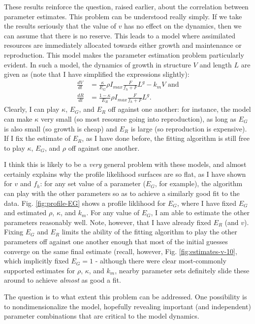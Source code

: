 \documentclass[12pt,reqno,final,pdftex]{amsart}\usepackage[]{graphicx}\usepackage[]{color}
\theoremstyle{plain}
\numberwithin{equation}{part}
\begin{document}
These results reinforce the question, raised earlier, about the correlation between parameter estimates.
This problem can be understood really simply.
If we take the results seriously that the value of $v$ has no effect on the dynamics, then we can assume that there is no reserve.
This leads to a model where assimilated resources are immediately allocated towards either growth and maintenance or reproduction.
This model makes the parameter estimation problem particularly evident.
In such a model, the dynamics of growth in structure $V$ and length $L$ are given as (note that I have simplified the expressions slightly):
\begin{align}
\frac{dV}{dt} &= \frac{\kappa}{E_G} \rho I_{max} \frac{F}{f_h+F} L^g - k_m V \text{ and} \\
\frac{dR}{dt} &= \frac{1-\kappa}{E_R} \rho I_{max} \frac{F}{f_h+F} L^g.
\end{align}
Clearly, I can play $\kappa$, $E_G$, and $E_R$ off against one another: for instance, the model can make $\kappa$ very small (so most resource going into reproduction), as long as $E_G$ is also small (so growth is cheap) and $E_R$ is large (so reproduction is expensive).
If I fix the estimate of $E_R$, as I have done before, the fitting algorithm is still free to play $\kappa$, $E_G$, and $\rho$ off against one another.

I think this is likely to be a \emph{very} general problem with these models, and almost certainly explains why the profile likelihood surfaces are so flat, as I have shown for $v$ and $f_h$: for any set value of a parameter ($E_G$, for example), the algorithm can play with the other parameters so as to achieve a similarly good fit to the data.
Fig. \ref{fig:profile-EG} shows a profile liklihood for $E_G$, where I have fixed $E_G$ and estimated $\rho$, $\kappa$, and $k_m$.
For any value of $E_G$, I am able to estimate the other parameters reasonably well.
Note, however, that I have already fixed $E_R$ (and $v$).
Fixing $E_G$ and $E_R$ limits the ability of the fitting algorithm to play the other parameters off against one another enough that most of the initial guesses converge on the same final estimate (recall, however, Fig. \ref{fig:estimates-v-10}, which implicitly fixed $E_G=1$ - although there were clear most-commonly supported estimates for $\rho$, $\kappa$, and $k_m$, nearby parameter sets definitely slide these around to achieve \emph{almost} as good a fit.


The question is to what extent this problem can be addressed.
One possibility is to nondimensionalize the model, hopefully revealing important (and independent) parameter combinations that are critical to the model dynamics.
\end{document}
